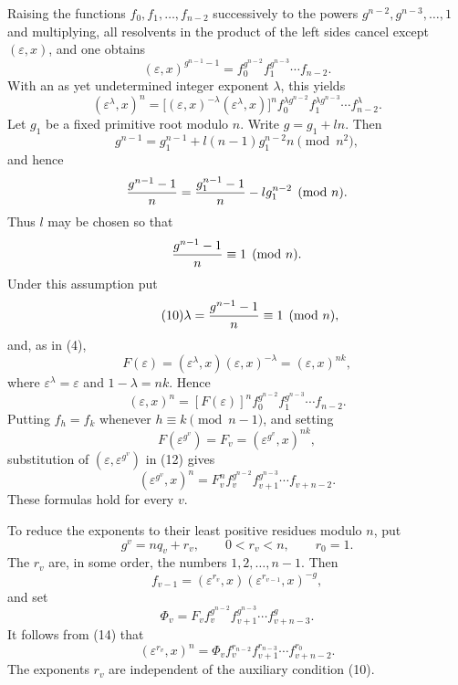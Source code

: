 \documentclass[11pt]{article}
\begin{document}
Raising the functions $f_0,f_1,\ldots,f_{n-2}$ successively to the powers $g^{n-2},g^{n-3},\ldots,1$ and multiplying, all resolvents in the product of the left sides cancel except $(\varepsilon,x)$, and one obtains
\begin{equation}\tag{8}
  (\varepsilon,x)^{g^{n-1}-1}=f_0^{g^{n-2}}f_1^{g^{n-3}}\cdots f_{n-2}.
\end{equation}
With an as yet undetermined integer exponent $\lambda$, this yields
\begin{equation}\tag{9}
  (\varepsilon^\lambda,x)^n=\big[(\varepsilon,x)^{-\lambda}(\varepsilon^\lambda,x)\big]^n
  f_0^{\lambda g^{n-2}}f_1^{\lambda g^{n-3}}\cdots f_{n-2}^{\lambda}.
\end{equation}
Let $g_1$ be a fixed primitive root modulo $n$. Write $g=g_1+ln$. Then
\[
  g^{n-1}=g_1^{n-1}+l(n-1)g_1^{n-2}n \pmod {n^2},
\]
and hence
\[
  {g^{n-1}-1\over n}={g_1^{n-1}-1\over n}-l g_1^{n-2}\pmod n.
\]
Thus $l$ may be chosen so that
\[
  {g^{n-1}-1\over n}\equiv 1\pmod n.
\]
Under this assumption put
\begin{equation}\tag{10}
  \lambda={g^{n-1}-1\over n}\equiv 1\pmod n,
\end{equation}
and, as in (4),
\begin{equation}\tag{11}
  F(\varepsilon)=(\varepsilon^\lambda,x)(\varepsilon,x)^{-\lambda}=(\varepsilon,x)^{nk},
\end{equation}
where $\varepsilon^\lambda=\varepsilon$ and $1-\lambda=nk$. Hence
\begin{equation}\tag{12}
  (\varepsilon,x)^n=[F(\varepsilon)]^n f_0^{g^{n-2}}f_1^{g^{n-3}}\cdots f_{n-2}.
\end{equation}
Putting $f_h=f_k$ whenever $h\equiv k\pmod{n-1}$, and setting
\begin{equation}\tag{13}
  F(\varepsilon^{g^v})=F_v=(\varepsilon^{g^v},x)^{nk},
\end{equation}
substitution of $(\varepsilon,\varepsilon^{g^v})$ in (12) gives
\begin{equation}\tag{14}
  (\varepsilon^{g^v},x)^n=F_v^n f_v^{g^{n-2}}f_{v+1}^{g^{n-3}}\cdots f_{v+n-2}.
\end{equation}
These formulas hold for every $v$.

To reduce the exponents to their least positive residues modulo $n$, put
\begin{equation}\tag{15}
  g^v=nq_v+r_v,\qquad 0<r_v<n,\qquad r_0=1.
\end{equation}
The $r_v$ are, in some order, the numbers $1,2,\ldots,n-1$. Then
\begin{equation}\tag{16}
  f_{v-1}=(\varepsilon^{r_v},x)(\varepsilon^{r_{v-1}},x)^{-g},
\end{equation}
and set
\begin{equation}\tag{17}
  \Phi_v=F_v f_v^{g^{n-2}}f_{v+1}^{g^{n-3}}\cdots f_{v+n-3}^{g}.
\end{equation}
It follows from (14) that
\begin{equation}\tag{18}
  (\varepsilon^{r_v},x)^n=\Phi_v f_v^{r_{n-2}}f_{v+1}^{r_{n-3}}\cdots f_{v+n-2}^{r_0}.
\end{equation}
The exponents $r_v$ are independent of the auxiliary condition (10).
\end{document}
